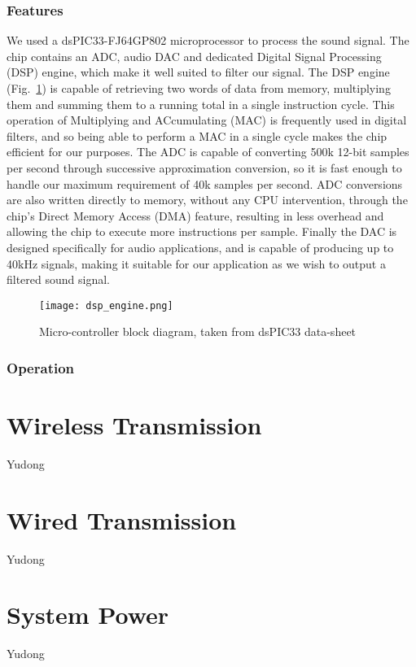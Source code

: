 \subsubsection{Features}
We used a dsPIC33-FJ64GP802 microprocessor to process the sound signal. The chip contains an ADC, audio DAC and dedicated Digital Signal Processing (DSP) engine, which make it well suited to filter our signal. The DSP engine (Fig.~\ref{fig:dsp_block}) is capable of retrieving two words of data from memory, multiplying them and summing them to a running total in a single instruction cycle. This operation of Multiplying and ACcumulating (MAC) is frequently used in digital filters, and so being able to perform a MAC in a single cycle makes the chip efficient for our purposes. The ADC is capable of converting 500k 12-bit samples per second through successive approximation conversion, so it is fast enough to handle our maximum requirement of 40k samples per second. ADC conversions are also written directly to memory, without any CPU intervention, through the chip's Direct Memory Access (DMA) feature, resulting in less overhead and allowing the chip to execute more instructions per sample. Finally the DAC is designed specifically for audio applications, and is capable of producing up to 40kHz signals, making it suitable for our application as we wish to output a filtered sound signal. 

\begin{figure}[!htb]
	\centering
		\texttt{[image: dsp\_engine.png]}
	\caption{Micro-controller block diagram, taken from dsPIC33 data-sheet \cite[p.~14]{dspic_datasheet}}
	\label{fig:dsp_block}
\end{figure}

\subsubsection{Operation}



\section{Wireless Transmission}
Yudong

\section{Wired Transmission}
Yudong

\section{System Power}
Yudong